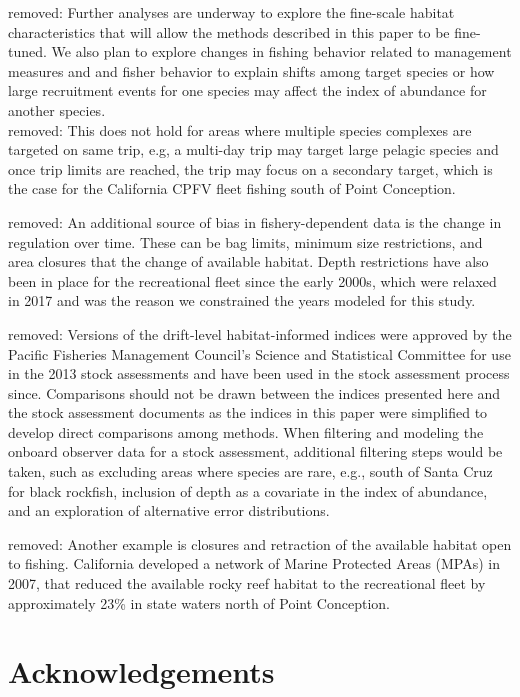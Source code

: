 \documentclass[
  12pt,
  authoryear,
  preprint,
  3p]{elsarticle}
\begin{document}
removed: Further analyses are underway to explore the fine-scale habitat
characteristics that will allow the methods described in this paper to
be fine-tuned. We also plan to explore changes in fishing behavior
related to management measures and and fisher behavior to explain shifts
among target species or how large recruitment events for one species may
affect the index of abundance for another species.\\
removed: This does not hold for areas where multiple species complexes
are targeted on same trip, e.g, a multi-day trip may target large
pelagic species and once trip limits are reached, the trip may focus on
a secondary target, which is the case for the California CPFV fleet
fishing south of Point Conception.

removed: An additional source of bias in fishery-dependent data is the
change in regulation over time. These can be bag limits, minimum size
restrictions, and area closures that the change of available habitat.
Depth restrictions have also been in place for the recreational fleet
since the early 2000s, which were relaxed in 2017 and was the reason we
constrained the years modeled for this study.

removed: Versions of the drift-level habitat-informed indices were
approved by the Pacific Fisheries Management Council's Science and
Statistical Committee for use in the 2013 stock assessments and have
been used in the stock assessment process since. Comparisons should not
be drawn between the indices presented here and the stock assessment
documents as the indices in this paper were simplified to develop direct
comparisons among methods. When filtering and modeling the onboard
observer data for a stock assessment, additional filtering steps would
be taken, such as excluding areas where species are rare, e.g., south of
Santa Cruz for black rockfish, inclusion of depth as a covariate in the
index of abundance, and an exploration of alternative error
distributions.

removed: Another example is closures and retraction of the available
habitat open to fishing. California developed a network of Marine
Protected Areas (MPAs) in 2007, that reduced the available rocky reef
habitat to the recreational fleet by approximately 23\% in state waters
north of Point Conception.

\hypertarget{acknowledgements}{%
\section{Acknowledgements}\label{acknowledgements}}
\end{document}
